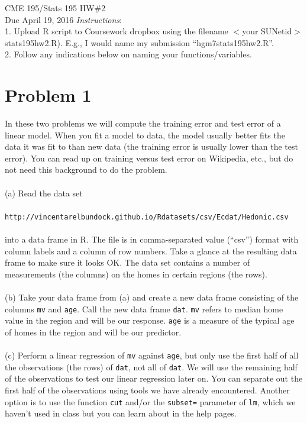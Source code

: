 \documentclass[11pt]{article}
\theoremstyle{plain}
\theoremstyle{definition}
\begin{document}
\noindent CME 195/Stats 195 HW\#2\\
Due April 19, 2016
\noindent \emph{Instructions}:\\1. Upload R script to Coursework
dropbox using the filename $<$your SUNetid$>$stats195hw2.R). E.g., I
would name my submission ``hgm7stats195hw2.R''.\\
2. Follow any indications below on naming your functions/variables.
\\
\section*{Problem 1} In these two problems we will compute the training error and test error of a linear model. When you fit a model to data, the model usually better fits the data it was fit to than new data (the training error is usually lower than the test error). You can read up on training versus test error on Wikipedia, etc., but do not need this background to do the problem.\\\\
\noindent
(a) Read the data set
\\\\
\texttt{http://vincentarelbundock.github.io/Rdatasets/csv/Ecdat/Hedonic.csv} \\\\into a data frame in R. The file is in comma-separated value (``csv'') format with column labels and a column of row numbers. Take a glance at the resulting data frame to make sure it looks OK. The data set contains a number of measurements (the columns) on the homes in certain regions (the rows).\\\\
\noindent
(b) Take your data frame from (a) and create a new data frame consisting of the columns \texttt{mv} and \texttt{age}. Call the new data frame \texttt{dat}. \texttt{mv} refers to median home value in the region and will be our response. \texttt{age} is a measure of the typical age of homes in the region and will be our predictor.\\\\
\noindent
(c) Perform a linear regression of \texttt{mv} against \texttt{age},
but only use the first half of all the observations (the rows) of
\texttt{dat}, not all of \texttt{dat}. We will use the remaining half
of the observations to test our linear regression later on. You can
separate out the first half of the observations using tools we have
already encountered. Another option is to use the function
\texttt{cut} and/or the \texttt{subset=} parameter of \texttt{lm},
which we haven't used in class but you can learn about in the help pages.
\end{document}
